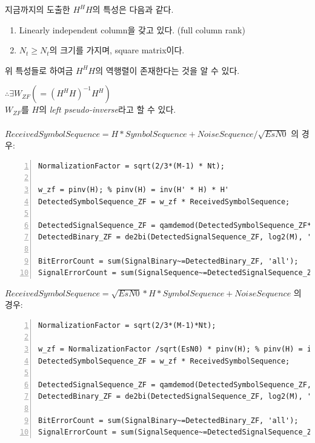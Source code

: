 \documentclass{article}
\begin{document}
\noindent
지금까지의 도출한 $H^H H$의 특성은 다음과 같다.
\begin{enumerate}
  \item Linearly independent column을 갖고 있다. (full column rank)
  \item $N_t\geq N_t$의 크기를 가지며, square matrix이다.
\end{enumerate}
위 특성들로 하여금 $H^H H$의 역행렬이 존재한다는 것을 알 수 있다.

\hspace{10cm}$\therefore \exists W_{ZF} (=(H^H H)^{-1}H^H)$
\vspace{0.5cm}\\
$W_{ZF}$를 $H$의 \textsl{left pseudo-inverse}라고 할 수 있다.\\
\\
$ReceivedSymbolSequence = H * SymbolSequence + NoiseSequence / \sqrt{EsN0}$ 의 경우:
\begin{lstlisting}[style=Matlab-editor, frame=single, numbers=left,]
NormalizationFactor = sqrt(2/3*(M-1) * Nt);

w_zf = pinv(H); % pinv(H) = inv(H' * H) * H'
DetectedSymbolSequence_ZF = w_zf * ReceivedSymbolSequence;

DetectedSignalSequence_ZF = qamdemod(DetectedSymbolSequence_ZF*NormalizationFactor, M);
DetectedBinary_ZF = de2bi(DetectedSignalSequence_ZF, log2(M), 'left-msb');

BitErrorCount = sum(SignalBinary~=DetectedBinary_ZF, 'all');
SignalErrorCount = sum(SignalSequence~=DetectedSignalSequence_ZF, 'all');
\end{lstlisting}
\newpage
\noindent
$ReceivedSymbolSequence = \sqrt{EsN0} * H * SymbolSequence + NoiseSequence$ 의 경우:
\begin{lstlisting}[style=Matlab-editor, frame=single, numbers=left,]
NormalizationFactor = sqrt(2/3*(M-1)*Nt);

w_zf = NormalizationFactor /sqrt(EsN0) * pinv(H); % pinv(H) = inv(H' * H) * H'
DetectedSymbolSequence_ZF = w_zf * ReceivedSymbolSequence;

DetectedSignalSequence_ZF = qamdemod(DetectedSymbolSequence_ZF, M);
DetectedBinary_ZF = de2bi(DetectedSignalSequence_ZF, log2(M), 'left-msb');

BitErrorCount = sum(SignalBinary~=DetectedBinary_ZF, 'all');
SignalErrorCount = sum(SignalSequence~=DetectedSignalSequence_ZF, 'all');
\end{lstlisting}
\end{document}
